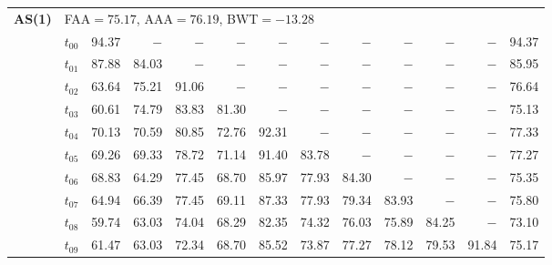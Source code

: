 \begin{table}[ht]
\begin{tabular}{@{}l l r r r r r r r r r r r@{}}
\midrule
\multirow{11}{*}{\textbf{AS(1)}} & \multicolumn{12}{l}{\quad\small FAA$=75.17$,\; AAA$=76.19$,\; BWT$=-13.28$} \\
 & $t_{00}$ & 94.37 & $-$ & $-$ & $-$ & $-$ & $-$ & $-$ & $-$ & $-$ & $-$ & 94.37 \\
 & $t_{01}$ & 87.88 & 84.03 & $-$ & $-$ & $-$ & $-$ & $-$ & $-$ & $-$ & $-$ & 85.95 \\
 & $t_{02}$ & 63.64 & 75.21 & 91.06 & $-$ & $-$ & $-$ & $-$ & $-$ & $-$ & $-$ & 76.64 \\
 & $t_{03}$ & 60.61 & 74.79 & 83.83 & 81.30 & $-$ & $-$ & $-$ & $-$ & $-$ & $-$ & 75.13 \\
 & $t_{04}$ & 70.13 & 70.59 & 80.85 & 72.76 & 92.31 & $-$ & $-$ & $-$ & $-$ & $-$ & 77.33 \\
 & $t_{05}$ & 69.26 & 69.33 & 78.72 & 71.14 & 91.40 & 83.78 & $-$ & $-$ & $-$ & $-$ & 77.27 \\
 & $t_{06}$ & 68.83 & 64.29 & 77.45 & 68.70 & 85.97 & 77.93 & 84.30 & $-$ & $-$ & $-$ & 75.35 \\
 & $t_{07}$ & 64.94 & 66.39 & 77.45 & 69.11 & 87.33 & 77.93 & 79.34 & 83.93 & $-$ & $-$ & 75.80 \\
 & $t_{08}$ & 59.74 & 63.03 & 74.04 & 68.29 & 82.35 & 74.32 & 76.03 & 75.89 & 84.25 & $-$ & 73.10 \\
 & $t_{09}$ & 61.47 & 63.03 & 72.34 & 68.70 & 85.52 & 73.87 & 77.27 & 78.12 & 79.53 & 91.84 & 75.17 \\
\bottomrule
\end{tabular}
\end{table}

